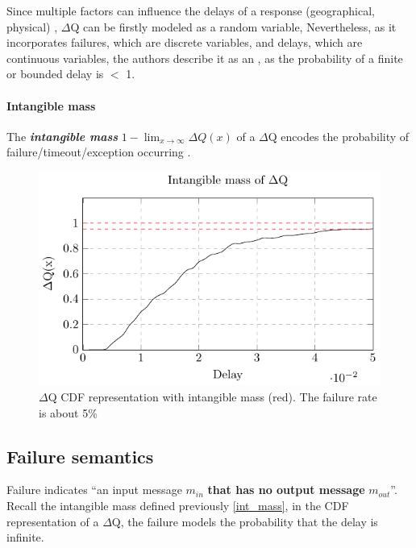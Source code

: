     Since multiple factors can influence the delays of a response (geographical, physical) \cite{dq-tut}, $\Delta$Q can be firstly modeled as a random variable,  Nevertheless, as it incorporates failures, which are discrete variables, and delays, which are continuous variables, the authors describe it as an , as the probability of a finite or bounded delay is $<$ 1. \cite{myo}
   
    \paragraph{Intangible mass} The \textbf{\textit{intangible mass}} $1 - \lim_{x\to\infty}\Delta Q(x)$ of a $\Delta$Q encodes the probability of failure/timeout/exception occurring \cite{art}. \label{int_mass}
        
    \begin{figure}[H]
        \begin{center}
            \includegraphics{tikz/intangible.pdf}
        \end{center}
        \caption{$\Delta$Q CDF representation with intangible mass (red). The failure rate is about 5\% }
    \end{figure}
   
  \subsection{Failure semantics}
       Failure indicates ``an input message $m_{in}$ \textbf{that has no output message} $m_{out}$''. \cite{art}
       Recall the intangible mass defined previously \ref{int_mass}, in the CDF representation of a $\Delta$Q, the failure models the probability that the delay is infinite.
   
